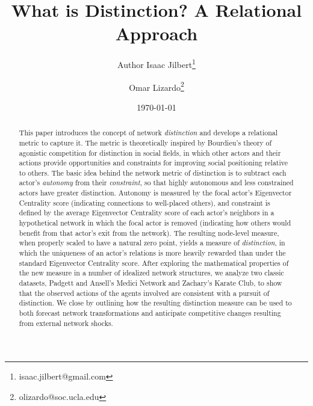 \documentclass[12pt]{article}
\begin{document}
\title{What is Distinction? A Relational Approach}
\author[1]{Author Isaac Jilbert\thanks{isaac.jilbert@gmail.com}}
\author[1]{Omar Lizardo\thanks{olizardo@soc.ucla.edu}}

\renewcommand\Authands{ and }

\date{\normalsize \today}	
\maketitle

\newpage
\begin{abstract}	
This paper introduces the concept of network \textit{distinction} and develops a relational metric to capture it. The metric is theoretically inspired by Bourdieu's theory of agonistic competition for distinction in social fields, in which other actors and their actions provide opportunities and constraints for improving social positioning relative to others. The basic idea behind the network metric of distinction is to subtract each actor's \textit{autonomy} from their \textit{constraint}, so that highly autonomous and less constrained actors have greater distinction. Autonomy is measured by the focal actor's Eigenvector Centrality score (indicating connections to well-placed others), and constraint is defined by the average Eigenvector Centrality score of each actor's neighbors in a hypothetical network in which the focal actor is removed (indicating how others would benefit from that actor's exit from the network). The resulting node-level measure, when properly scaled to have a natural zero point, yields a measure of \textit{distinction}, in which the uniqueness of an actor's relations is more heavily rewarded than under the standard Eigenvector Centrality score. After exploring the mathematical properties of the new measure in a number of idealized network structures, we analyze two classic datasets, Padgett and Ansell's \citeyearpar{padgett1993robust} Medici Network and Zachary's \citeyearpar{zachary1977information} Karate Club, to show that the observed actions of the agents involved are consistent with a pursuit of distinction. We close by outlining how the resulting distinction measure can be used to both forecast network transformations and anticipate competitive changes resulting from external network shocks.    
\end{abstract}

\newpage
\end{document}
